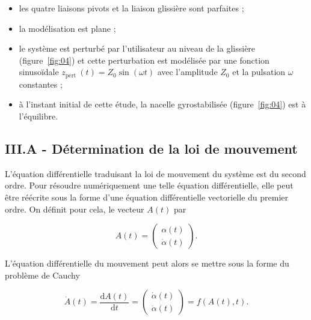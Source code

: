 \begin{itemize}
  \item les quatre liaisons pivots et la liaison glissière sont parfaites ;
  \item la modélisation est plane ;
  \item le système est perturbé par l'utilisateur au niveau de la glissière (figure~\ref{fig:04}) et cette perturbation est modélisée par une fonction sinusoïdale $z_{\text {pert }}(t)=Z_{0} \sin (\omega t)$ avec l'amplitude $Z_{0}$ et la pulsation $\omega$ constantes ;
  \item à l'instant initial de cette étude, la nacelle gyrostabilisée (figure~\ref{fig:04}) est à l'équilibre.
\end{itemize}

\subsection{III.A - Détermination de la loi de mouvement}
\ifprof
\begin{corrige}
\end{corrige}
\else
\fi

L'équation différentielle traduisant la loi de mouvement du système est du second ordre. Pour résoudre numériquement une telle équation différentielle, elle peut être réécrite sous la forme d'une équation différentielle vectorielle du premier ordre. On définit pour cela, le vecteur $A(t)$ par

$$
A(t)=\left(\begin{array}{c}
\alpha(t) \\
\dot{\alpha}(t)
\end{array}\right) .
$$

L'équation différentielle du mouvement peut alors se mettre sous la forme du problème de Cauchy

$$
\dot{A}(t)=\frac{\mathrm{d} A(t)}{\mathrm{d} t}=\left(\begin{array}{c}
\dot{\alpha}(t) \\
\ddot{\alpha}(t)
\end{array}\right)=f(A(t), t) .
$$

